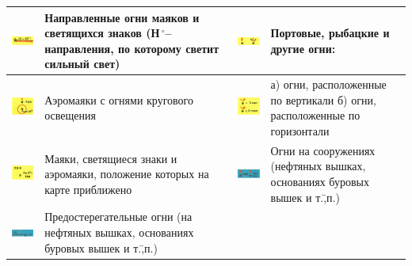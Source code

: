 \documentclass[a4paper, 12pt, twoside, final, book, russian, fittopage, cyremdash]{ncc}
\newcommand{\gr}{\ensuremath{\,^\circ}\xspace}
\begin{document}
\begin{longtable}{M|m{0.2\textwidth}|M|m{0.2\textwidth}}
  \midrule
  \includegraphics[scale=1.3]{APP-2-B-4} & Направленные огни маяков и светящихся знаков (Н\gr \--- направления, по которому светит сильный свет) &
  \includegraphics[scale=1.3]{APP-2-B-8} & Портовые, рыбацкие и другие огни: \\
  \midrule
  \includegraphics[scale=1.3]{APP-2-B-5} & Аэромаяки с огнями кругового освещения &
  \includegraphics[scale=1.3]{APP-2-B-9} & а) огни, расположенные по вертикали \newline б) огни, расположенные по горизонтали \\
  \midrule
  \includegraphics[scale=1.3]{APP-2-B-10} & Маяки, светящиеся знаки и аэромаяки, положение которых на карте приближено &
  \includegraphics[scale=1.3]{APP-2-B-11} & Огни на сооружениях (нефтяных вышках, основаниях буровых вышек и т.\=,п.) \\
  \midrule
  \includegraphics[scale=1.3]{APP-2-B-12} & Предостерегательные огни (на нефтяных вышках, основаниях буровых вышек и т.\=,п.) &

\end{longtable}
\end{document}
